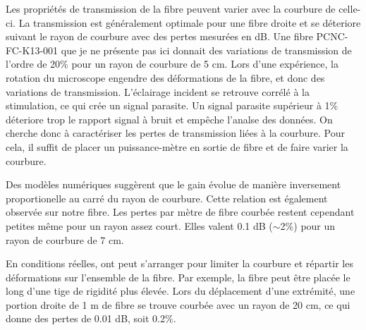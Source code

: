 Les propriétés de transmission de la fibre peuvent varier avec la courbure de celle-ci. La transmission est généralement optimale pour une fibre droite et se déteriore suivant le rayon de courbure avec des pertes mesurées en dB. Une fibre PCNC-FC-K13-001 que je ne présente pas ici donnait des variations de transmission de l'ordre de 20\% pour un rayon de courbure de 5 cm.
Lors d'une expérience, la rotation du microscope engendre des déformations de la fibre, et donc des variations de transmission. L'éclairage incident se retrouve corrélé à la stimulation, ce qui crée un signal parasite. Un signal parasite supérieur à 1\% déteriore trop le rapport signal à bruit et empêche l'analse des données. On cherche donc à caractériser les pertes de transmission liées à la courbure. Pour cela, il suffit de placer un puissance-mètre en sortie de fibre et de faire varier la courbure.

Des modèles numériques \cite{setti_flexible_2013} \cite{yu_negative_2016} \cite{frosz_analytical_2017} suggèrent que le gain évolue de manière inversement proportionelle au carré du rayon de courbure. Cette relation est également observée sur notre fibre.
Les pertes par mètre de fibre courbée restent cependant petites même pour un rayon assez court. Elles valent 0.1 dB ($\sim$2\%) pour un rayon de courbure de 7 cm.

En conditions réelles, ont peut s'arranger pour limiter la courbure et répartir les déformations sur l'ensemble de la fibre. Par exemple, la fibre peut être placée le long d'une tige de rigidité plus élevée. Lors du déplacement d'une extrémité, une portion droite de 1 m de fibre se trouve courbée avec un rayon de 20 cm, ce qui donne des pertes de 0.01 dB, soit 0.2\%.


